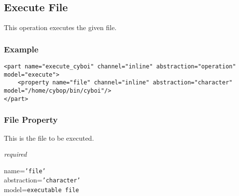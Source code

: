 %
%
%
%
%
%

\subsection{Execute File}
\label{execute_file_heading}

This operation executes the given file.

\subsubsection{Example}

\begin{scriptsize}
    \begin{verbatim}
<part name="execute_cyboi" channel="inline" abstraction="operation" model="execute">
    <property name="file" channel="inline" abstraction="character" model="/home/cybop/bin/cyboi"/>
</part>
    \end{verbatim}
\end{scriptsize}

\subsubsection{File Property}

This is the file to be executed.

\emph{required}

name=\texttt{'file'}\\
abstraction=\texttt{'character'}\\
model=\texttt{executable file}
